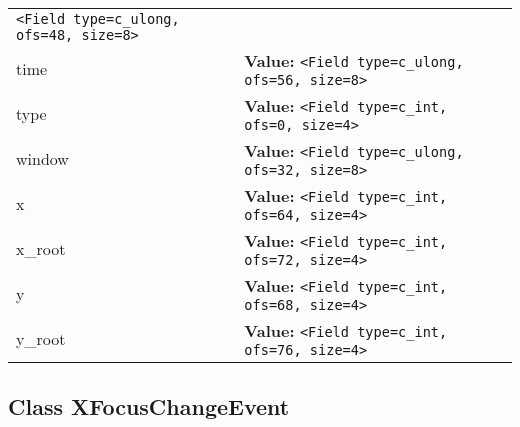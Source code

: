 \begin{longtable}{|p{\varnamewidth}|p{\vardescrwidth}|l}
{\tt {\textless}Field type=c\_ulong, ofs=48, size=8{\textgreater}}&\\
\cline{1-2}
\raggedright t\-i\-m\-e\- & \raggedright \textbf{Value:} 
{\tt {\textless}Field type=c\_ulong, ofs=56, size=8{\textgreater}}&\\
\cline{1-2}
\raggedright t\-y\-p\-e\- & \raggedright \textbf{Value:} 
{\tt {\textless}Field type=c\_int, ofs=0, size=4{\textgreater}}&\\
\cline{1-2}
\raggedright w\-i\-n\-d\-o\-w\- & \raggedright \textbf{Value:} 
{\tt {\textless}Field type=c\_ulong, ofs=32, size=8{\textgreater}}&\\
\cline{1-2}
\raggedright x\- & \raggedright \textbf{Value:} 
{\tt {\textless}Field type=c\_int, ofs=64, size=4{\textgreater}}&\\
\cline{1-2}
\raggedright x\-\_\-r\-o\-o\-t\- & \raggedright \textbf{Value:} 
{\tt {\textless}Field type=c\_int, ofs=72, size=4{\textgreater}}&\\
\cline{1-2}
\raggedright y\- & \raggedright \textbf{Value:} 
{\tt {\textless}Field type=c\_int, ofs=68, size=4{\textgreater}}&\\
\cline{1-2}
\raggedright y\-\_\-r\-o\-o\-t\- & \raggedright \textbf{Value:} 
{\tt {\textless}Field type=c\_int, ofs=76, size=4{\textgreater}}&\\
\cline{1-2}
\end{longtable}



\subsection{Class XFocusChangeEvent}


